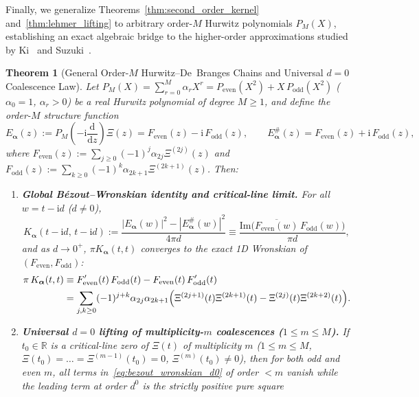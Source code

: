 \documentclass[11pt,reqno]{amsart}
\newtheorem{theorem}{Theorem}[section]
\theoremstyle{definition}
\theoremstyle{remark}
\numberwithin{equation}{section}
\newcommand{\R}{\mathbb{R}}
\newcommand{\dd}{\mathrm{d}}
\newcommand{\ii}{\mathrm{i}}
\newcommand{\Ima}{\mathrm{Im}}
\begin{document}
Finally, we generalize Theorems~\ref{thm:second_order_kernel} and~\ref{thm:lehmer_lifting} to arbitrary order-$M$ Hurwitz polynomials $P_M(X)$, establishing an exact algebraic bridge to the higher-order approximations studied by Ki~\cite{ki2008} and Suzuki~\cite{suzuki2011}.

\begin{theorem}[General Order-$M$ Hurwitz--De~Branges Chains and Universal $d=0$ Coalescence Law]\label{thm:hurwitz_chain}
Let $P_M(X) = \sum_{r=0}^M \alpha_r X^r = P_{\mathrm{even}}(X^2) + X\,P_{\mathrm{odd}}(X^2)$ ($\alpha_0 = 1$, $\alpha_r > 0$) be a real Hurwitz polynomial of degree $M \ge 1$, and define the order-$M$ structure function
\begin{equation}\label{eq:E_alpha_M_def}
E_{\boldsymbol{\alpha}}(z) := P_M\!\left(-\ii\frac{\dd}{\dd z}\right)\Xi(z) = F_{\mathrm{even}}(z) - \ii\,F_{\mathrm{odd}}(z), \qquad E_{\boldsymbol{\alpha}}^\#(z) = F_{\mathrm{even}}(z) + \ii\,F_{\mathrm{odd}}(z),
\end{equation}
where $F_{\mathrm{even}}(z) := \sum_{j \ge 0} (-1)^j \alpha_{2j}\Xi^{(2j)}(z)$ and $F_{\mathrm{odd}}(z) := \sum_{k \ge 0} (-1)^k \alpha_{2k+1}\Xi^{(2k+1)}(z)$. Then:
\begin{enumerate}[label=\textup{(\roman*)},leftmargin=2.2em]
\item \textbf{Global Bézout--Wronskian identity and critical-line limit.} For all $w = t - \ii d$ ($d \neq 0$),
\begin{equation}\label{eq:bezout_wronskian_d}
K_{\boldsymbol{\alpha}}(t - \ii d,\, t - \ii d) := \frac{|E_{\boldsymbol{\alpha}}(w)|^2 - |E_{\boldsymbol{\alpha}}^\#(w)|^2}{4\pi d} \equiv \frac{\Ima\bigl(\overline{F_{\mathrm{even}}(w)}\,F_{\mathrm{odd}}(w)\bigr)}{\pi d},
\end{equation}
and as $d \to 0^+$, $\pi K_{\boldsymbol{\alpha}}(t,t)$ converges to the exact 1D Wronskian of $(F_{\mathrm{even}}, F_{\mathrm{odd}})$:
\begin{equation}\label{eq:bezout_wronskian_d0}
\begin{aligned}
\pi\,K_{\boldsymbol{\alpha}}(t,t) &\equiv F_{\mathrm{even}}'(t)\,F_{\mathrm{odd}}(t) - F_{\mathrm{even}}(t)\,F_{\mathrm{odd}}'(t) \\
&= \sum_{j,k \ge 0} (-1)^{j+k}\alpha_{2j}\alpha_{2k+1}\Bigl(\Xi^{(2j+1)}(t)\Xi^{(2k+1)}(t) - \Xi^{(2j)}(t)\Xi^{(2k+2)}(t)\Bigr).
\end{aligned}
\end{equation}
\item \textbf{Universal $d=0$ lifting of multiplicity-$m$ coalescences ($1 \le m \le M$).} If $t_0 \in \R$ is a critical-line zero of $\Xi(t)$ of multiplicity $m$ ($1 \le m \le M$, $\Xi(t_0) = \dots = \Xi^{(m-1)}(t_0) = 0$, $\Xi^{(m)}(t_0) \neq 0$), then for both odd and even $m$, all terms in~\eqref{eq:bezout_wronskian_d0} of order $< m$ vanish while the leading term at order $d^0$ is the strictly positive pure square

\end{enumerate}
\end{theorem}
\end{document}
